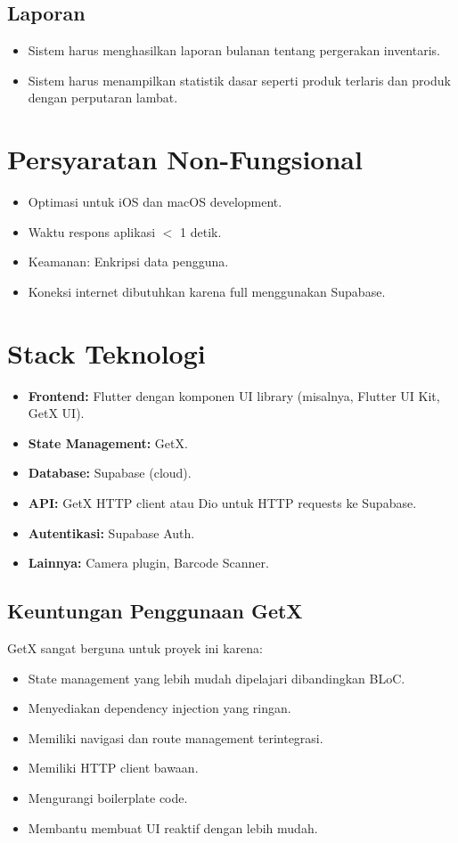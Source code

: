\documentclass[a4paper,12pt]{article}
\begin{document}
\subsection{Laporan}
\begin{itemize}[leftmargin=1.5cm]
    \item Sistem harus menghasilkan laporan bulanan tentang pergerakan inventaris.
    \item Sistem harus menampilkan statistik dasar seperti produk terlaris dan produk dengan perputaran lambat.
\end{itemize}

\section{Persyaratan Non-Fungsional}
\begin{itemize}[leftmargin=1.5cm]
    \item Optimasi untuk iOS dan macOS development.
    \item Waktu respons aplikasi $<$ 1 detik.
    \item Keamanan: Enkripsi data pengguna.
    \item Koneksi internet dibutuhkan karena full menggunakan Supabase.
\end{itemize}

\section{Stack Teknologi}
\begin{itemize}[leftmargin=1.5cm]
    \item \textbf{Frontend:} Flutter dengan komponen UI library (misalnya, Flutter UI Kit, GetX UI).
    \item \textbf{State Management:} GetX.
    \item \textbf{Database:} Supabase (cloud).
    \item \textbf{API:} GetX HTTP client atau Dio untuk HTTP requests ke Supabase.
    \item \textbf{Autentikasi:} Supabase Auth.
    \item \textbf{Lainnya:} Camera plugin, Barcode Scanner.
\end{itemize}

\subsection{Keuntungan Penggunaan GetX}
GetX sangat berguna untuk proyek ini karena:
\begin{itemize}[leftmargin=1.5cm]
    \item State management yang lebih mudah dipelajari dibandingkan BLoC.
    \item Menyediakan dependency injection yang ringan.
    \item Memiliki navigasi dan route management terintegrasi.
    \item Memiliki HTTP client bawaan.
    \item Mengurangi boilerplate code.
    \item Membantu membuat UI reaktif dengan lebih mudah.
\end{itemize}
\end{document}
